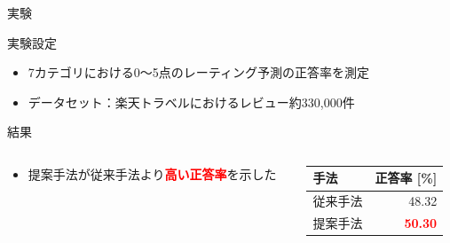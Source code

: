 \documentclass[aspectratio=43,unicode,10pt]{beamer}
\newcommand{\fire}[1]{\textcolor{red}{\textbf{#1}}}
\begin{document}
\begin{frame}{実験}{}
  \begin{block}{実験設定}
    \begin{itemize}
      \item 7カテゴリにおける0〜5点のレーティング予測の正答率を測定
      \item データセット：楽天トラベルにおけるレビュー約330,000件
    \end{itemize}
  \end{block}
  \begin{block}{結果}
    \begin{columns}[onlytextwidth,t]
      \begin{column}{0.6\linewidth}
        \begin{itemize}
          \item 提案手法が従来手法より\fire{高い正答率}を示した
        \end{itemize}
      \end{column}
      \begin{column}{0.4\linewidth}
        \begin{table}
          \centering
          \begin{tabular}{l | r}
            手法 & 正答率 {[}\%{]} \\
            \hline
            従来手法 & 48.32 \\
            提案手法 & \fire{50.30} \\
          \end{tabular}
        \end{table}
      \end{column}
    \end{columns}
  \end{block}
\end{frame}
\end{document}
